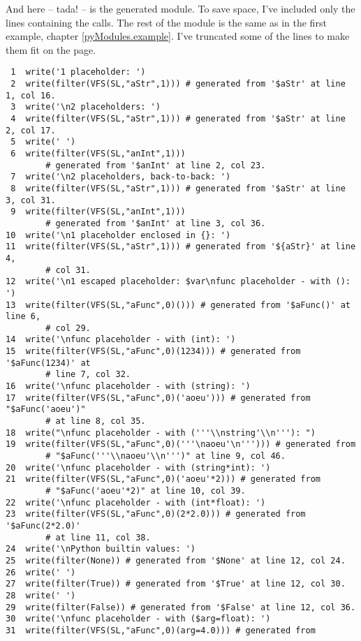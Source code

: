And here -- tada! -- is the generated module.
To save space, I've included only the lines containing the  calls.
The rest of the module is the same as in the first example, chapter
\ref{pyModules.example}.  I've truncated some of the lines to make them fit on
the page.

\begin{verbatim}
 1  write('1 placeholder: ')
 2  write(filter(VFS(SL,"aStr",1))) # generated from '$aStr' at line 1, col 16.
 3  write('\n2 placeholders: ')
 4  write(filter(VFS(SL,"aStr",1))) # generated from '$aStr' at line 2, col 17.
 5  write(' ')
 6  write(filter(VFS(SL,"anInt",1))) 
        # generated from '$anInt' at line 2, col 23.
 7  write('\n2 placeholders, back-to-back: ')
 8  write(filter(VFS(SL,"aStr",1))) # generated from '$aStr' at line 3, col 31.
 9  write(filter(VFS(SL,"anInt",1))) 
        # generated from '$anInt' at line 3, col 36.
10  write('\n1 placeholder enclosed in {}: ')
11  write(filter(VFS(SL,"aStr",1))) # generated from '${aStr}' at line 4, 
        # col 31.
12  write('\n1 escaped placeholder: $var\nfunc placeholder - with (): ')
13  write(filter(VFS(SL,"aFunc",0)())) # generated from '$aFunc()' at line 6, 
        # col 29.
14  write('\nfunc placeholder - with (int): ')
15  write(filter(VFS(SL,"aFunc",0)(1234))) # generated from '$aFunc(1234)' at 
        # line 7, col 32.
16  write('\nfunc placeholder - with (string): ')
17  write(filter(VFS(SL,"aFunc",0)('aoeu'))) # generated from "$aFunc('aoeu')"
        # at line 8, col 35.
18  write("\nfunc placeholder - with ('''\\nstring'\\n'''): ")
19  write(filter(VFS(SL,"aFunc",0)('''\naoeu'\n'''))) # generated from 
        # "$aFunc('''\\naoeu'\\n''')" at line 9, col 46.
20  write('\nfunc placeholder - with (string*int): ')
21  write(filter(VFS(SL,"aFunc",0)('aoeu'*2))) # generated from 
        # "$aFunc('aoeu'*2)" at line 10, col 39.
22  write('\nfunc placeholder - with (int*float): ')
23  write(filter(VFS(SL,"aFunc",0)(2*2.0))) # generated from '$aFunc(2*2.0)' 
        # at line 11, col 38.
24  write('\nPython builtin values: ')
25  write(filter(None)) # generated from '$None' at line 12, col 24.
26  write(' ')
27  write(filter(True)) # generated from '$True' at line 12, col 30.
28  write(' ')
29  write(filter(False)) # generated from '$False' at line 12, col 36.
30  write('\nfunc placeholder - with ($arg=float): ')
31  write(filter(VFS(SL,"aFunc",0)(arg=4.0))) # generated from 

\end{verbatim}
